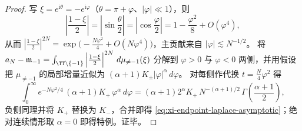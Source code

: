 \begin{proof}
写 \(\xi=e^{\mathrm{i}\theta}=-e^{\mathrm{i}\varphi}\)（\(\theta=\pi+\varphi\)、\(|\varphi|\ll 1\)），则
\[
\left|\frac{1-\xi}{2}\right|
=\left|\sin\frac{\theta}{2}\right|
=\left|\cos\frac{\varphi}{2}\right|
=1-\frac{\varphi^2}{8}+O(\varphi^4),
\]
从而 \(\left|\frac{1-\xi}{2}\right|^{2N}=\exp\!\bigl(-\frac{N\varphi^2}{4}+O(N\varphi^4)\bigr)\)，主贡献来自 \(|\varphi|\lesssim N^{-1/2}\)。
将 \(a_N-\mathfrak m_{-1}=\int_{\TT\setminus\{-1\}}\left|\frac{1-\xi}{2}\right|^{2N}\,d\mu_{\neq-1}(\xi)\) 分解到 \(\varphi>0\) 与 \(\varphi<0\) 两侧，并用假设把 \(\mu_{\neq-1}\) 的局部增量近似为 \((\alpha+1)K_\pm|\varphi|^{\alpha}\,d\varphi\)。
对每侧作代换 \(t=\frac{N}{4}\varphi^2\) 得
\[
\int_{0}^{\infty}e^{-N\varphi^2/4}\,(\alpha+1)K_+\,\varphi^{\alpha}\,d\varphi
=(\alpha+1)2^{\alpha}K_+\,N^{-(\alpha+1)/2}\,
\Gamma\!\left(\frac{\alpha+1}{2}\right),
\]
负侧同理并将 \(K_+\) 替换为 \(K_-\)，合并即得 \eqref{eq:xi-endpoint-laplace-asymptotic}；绝对连续情形取 \(\alpha=0\) 即得特例。证毕。
\end{proof}

